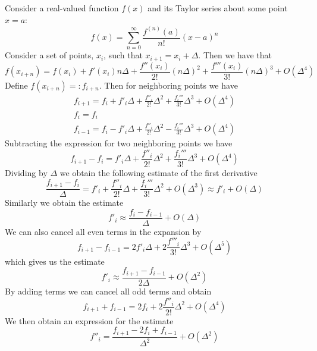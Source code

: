 \documentclass[12pt, a4paper, oneside, openright, titlepage]{book}
\begin{document}
\begin{proc}
        Consider a real-valued function $f(x)$ and its Taylor series about some point $x=a$:\begin{equation}
                f(x) = \sum_{n=0}^{\infty}\frac{f^{(n)}(a)}{n!}(x-a)^n
        \end{equation}
        Consider a set of points, $x_i$, such that $x_{i+1} = x_i + \Delta$. Then we have that \begin{equation}
                f(x_{i+n}) = f(x_i) + f'(x_i)n\Delta + \frac{f''(x_i)}{2!}(n\Delta)^2+\frac{f'''(x_i)}{3!}(n\Delta)^3+O(\Delta^4)
        \end{equation}
        Define $f(x_{i+n}) =: f_{i+n}$. Then for neighboring points we have \begin{align}
                f_{i+1} = f_i+f'_i\Delta +\frac{f''_i}{2!}\Delta^2 + \frac{f_i'''}{3!}\Delta^3 + O(\Delta^4) \\
                f_i = f_i \\
                f_{i-1} = f_i-f'_i\Delta +\frac{f''_i}{2!}\Delta^2 - \frac{f_i'''}{3!}\Delta^3 + O(\Delta^4)
        \end{align}
        Subtracting the expression for two neighboring points we have \begin{equation}
                f_{i+1} - f_i = f'_i\Delta +\frac{f''_i}{2!}\Delta^2 + \frac{f_i'''}{3!}\Delta^3 + O(\Delta^4)
        \end{equation}
        Dividing by $\Delta$ we obtain the following  estimate of the first derivative \begin{equation}
                \frac{f_{i+1} - f_i}{\Delta} = f'_i+\frac{f''_i}{2!}\Delta + \frac{f_i'''}{3!}\Delta^2 + O(\Delta^3) \approx f'_i + O(\Delta)
        \end{equation}
        Similarly we obtain the  estimate \begin{equation}
                f'_i \approx \frac{f_i - f_{i-1}}{\Delta} + O(\Delta)
        \end{equation}
        We can also cancel all even terms in the expansion by \begin{equation}
                f_{i+1} - f_{i-1} = 2f'_i\Delta +2\frac{f'''_i}{3!}\Delta^3+O(\Delta^5)
        \end{equation}
        which gives us the  estimate \begin{equation}
                f'_i \approx \frac{f_{i+1} - f_{i-1}}{2\Delta} + O(\Delta^2)
        \end{equation}
        By adding terms we can cancel all odd terms and obtain \begin{equation}
                f_{i+1} + f_{i-1} = 2f_i + 2\frac{f''_i}{2!}\Delta^2 + O(\Delta^4)
        \end{equation}
        We then obtain an expression for the  estimate \begin{equation}
                f''_i = \frac{f_{i+1} - 2f_i + f_{i-1}}{\Delta^2} + O(\Delta^2)
        \end{equation}
\end{proc}
\end{document}
